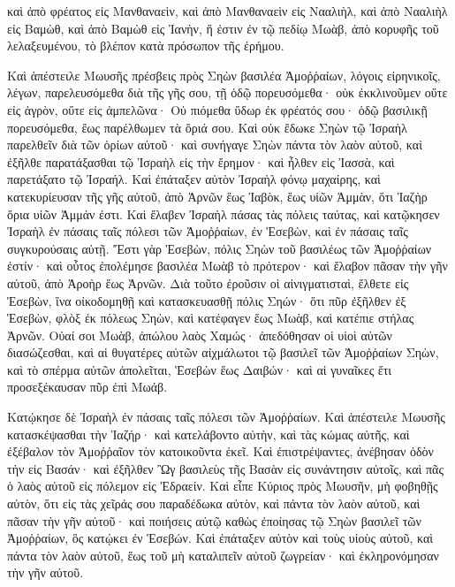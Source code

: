 {καὶ ἀπὸ φρέατος εἰς Μανθαναεὶν, καὶ ἀπὸ Μανθαναεὶν εἰς Νααλιὴλ, καὶ ἀπὸ Νααλιὴλ εἰς Βαμὼθ, καὶ ἀπὸ Βαμὼθ εἰς Ἰανὴν, ἥ ἐστιν ἐν τῷ πεδίῳ Μωὰβ, ἀπὸ κορυφῆς τοῦ λελαξευμένου, τὸ βλέπον κατὰ πρόσωπον τῆς ἐρήμου.
\par }{\PP {}Καὶ ἀπέστειλε Μωυσῆς πρέσβεις πρὸς Σηὼν βασιλέα Ἀμοῤῥαίων, λόγοις εἰρηνικοῖς, λέγων,
παρελευσόμεθα διὰ τῆς γῆς σου, τῇ ὁδῷ πορευσόμεθα· οὐκ ἐκκλινοῦμεν οὔτε εἰς ἀγρὸν, οὔτε εἰς ἀμπελῶνα·
Οὐ πιόμεθα ὕδωρ ἐκ φρέατός σου· ὁδῷ βασιλικῇ πορευσόμεθα, ἕως παρέλθωμεν τὰ ὅριά σου.
Καὶ οὐκ ἔδωκε Σηὼν τῷ Ἰσραὴλ παρελθεῖν διὰ τῶν ὁρίων αὐτοῦ· καὶ συνήγαγε Σηὼν πάντα τὸν λαὸν αὐτοῦ, καὶ ἐξῆλθε παρατάξασθαι τῷ Ἰσραὴλ εἰς τὴν ἔρημον· καὶ ἦλθεν εἰς Ἰασσὰ, καὶ παρετάξατο τῷ Ἰσραήλ.
Καὶ ἐπάταξεν αὐτὸν Ἰσραὴλ φόνῳ μαχαίρης, καὶ κατεκυρίευσαν τῆς γῆς αὐτοῦ, ἀπὸ Ἀρνῶν ἕως Ἰαβὸκ, ἕως υἱῶν Ἀμμὰν, ὅτι Ἰαζὴρ ὅρια υἱῶν Ἀμμάν ἐστι.
Καὶ ἔλαβεν Ἰσραὴλ πάσας τὰς πόλεις ταύτας, καὶ κατῷκησεν Ἰσραὴλ ἐν πάσαις ταῖς πόλεσι τῶν Ἀμοῤῥαίων, ἐν Ἑσεβὼν, καὶ ἐν πάσαις ταῖς συγκυρούσαις αὐτῇ.
Ἔστι γὰρ Ἐσεβὼν, πόλις Σηὼν τοῦ βασιλέως τῶν Ἀμοῤῥαίων ἐστίν· καὶ οὗτος ἐπολέμησε βασιλέα Μωὰβ τὸ πρότερον· καὶ ἔλαβον πᾶσαν τὴν γῆν αὐτοῦ, ἀπὸ Ἀροὴρ ἕως Ἀρνῶν.
Διὰ τοῦτο ἐροῦσιν οἱ αἰνιγματισταὶ, ἔλθετε εἰς Ἐσεβὼν, ἵνα οἰκοδομηθῇ καὶ κατασκευασθῇ πόλις Σηών·
ὅτι πῦρ ἐξῆλθεν ἐξ Ἑσεβὼν, φλὸξ ἐκ πόλεως Σηὼν, καὶ κατέφαγεν ἕως Μωὰβ, καὶ κατέπιε στήλας Ἀρνῶν.
Οὐαί σοι Μωὰβ, ἀπώλου λαὸς Χαμώς· ἀπεδόθησαν οἱ υἱοὶ αὐτῶν διασώζεσθαι, καὶ αἱ θυγατέρες αὐτῶν αἰχμάλωτοι τῷ βασιλεῖ τῶν Ἀμοῤῥαίων Σηὼν,
καὶ τὸ σπέρμα αὐτῶν ἀπολεῖται, Ἑσεβὼν ἕως Δαιβών· καὶ αἱ γυναῖκες ἔτι προσεξέκαυσαν πῦρ ἐπὶ Μωάβ.
\par }{\PP {}Κατῴκησε δὲ Ἰσραὴλ ἐν πάσαις ταῖς πόλεσι τῶν Ἀμοῤῥαίων.
Καὶ ἀπέστειλε Μωυσῆς κατασκέψασθαι τὴν Ἰαζήρ· καὶ κατελάβοντο αὐτὴν, καὶ τὰς κώμας αὐτῆς, καὶ ἐξέβαλον τὸν Ἀμοῤῥαῖον τὸν κατοικοῦντα ἐκεῖ.
Καὶ ἐπιστρέψαντες, ἀνέβησαν ὁδὸν τὴν εἰς Βασάν· καὶ ἐξῆλθεν Ὢγ βασιλεὺς τῆς Βασὰν εἰς συνάντησιν αὐτοῖς, καὶ πᾶς ὁ λαὸς αὐτοῦ εἰς πόλεμον εἰς Ἐδραείν.
Καὶ εἶπε Κύριος πρὸς Μωυσῆν, μὴ φοβηθῇς αὐτὸν, ὅτι εἰς τὰς χεῖράς σου παραδέδωκα αὐτὸν, καὶ πάντα τὸν λαὸν αὐτοῦ, καὶ πᾶσαν τὴν γῆν αὐτοῦ· καὶ ποιήσεις αὐτῷ καθὼς ἐποίησας τῷ Σηὼν βασιλεῖ τῶν Ἀμοῤῥαίων, ὃς κατῴκει ἐν Ἑσεβών.
Καὶ ἐπάταξεν αὐτὸν καὶ τοὺς υἱοὺς αὐτοῦ, καὶ πάντα τὸν λαὸν αὐτοῦ, ἕως τοῦ μὴ καταλιπεῖν αὐτοῦ ζωγρείαν· καὶ ἐκληρονόμησαν τὴν γῆν αὐτοῦ.

}
